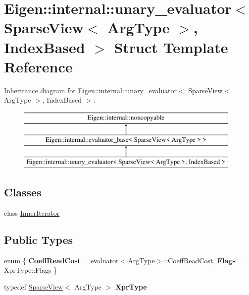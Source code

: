 \hypertarget{struct_eigen_1_1internal_1_1unary__evaluator_3_01_sparse_view_3_01_arg_type_01_4_00_01_index_based_01_4}{}\section{Eigen\+::internal\+::unary\+\_\+evaluator$<$ Sparse\+View$<$ Arg\+Type $>$, Index\+Based $>$ Struct Template Reference}
\label{struct_eigen_1_1internal_1_1unary__evaluator_3_01_sparse_view_3_01_arg_type_01_4_00_01_index_based_01_4}
Inheritance diagram for Eigen\+::internal\+::unary\+\_\+evaluator$<$ Sparse\+View$<$ Arg\+Type $>$, Index\+Based $>$\+:\begin{figure}[H]
\begin{center}
\leavevmode
\includegraphics[height=3.000000cm]{struct_eigen_1_1internal_1_1unary__evaluator_3_01_sparse_view_3_01_arg_type_01_4_00_01_index_based_01_4}
\end{center}
\end{figure}
\subsection*{Classes}
\begin{DoxyCompactItemize}
\item 
class \mbox{\hyperlink{class_eigen_1_1internal_1_1unary__evaluator_3_01_sparse_view_3_01_arg_type_01_4_00_01_index_based_01_4_1_1_inner_iterator}{Inner\+Iterator}}
\end{DoxyCompactItemize}
\subsection*{Public Types}
\begin{DoxyCompactItemize}
\item 
\mbox{\label{struct_eigen_1_1internal_1_1unary__evaluator_3_01_sparse_view_3_01_arg_type_01_4_00_01_index_based_01_4_a13f4da125c6786cc6b212c5bbc64f117}} 
enum \{ {\bfseries Coeff\+Read\+Cost} = evaluator$<$Arg\+Type$>$\+::Coeff\+Read\+Cost, 
{\bfseries Flags} = Xpr\+Type\+::Flags
 \}
\item 
\mbox{\label{struct_eigen_1_1internal_1_1unary__evaluator_3_01_sparse_view_3_01_arg_type_01_4_00_01_index_based_01_4_ad2888d8fc55a68579255c23a2ecc9bbd}} 
typedef \mbox{\hyperlink{class_eigen_1_1_sparse_view}{Sparse\+View}}$<$ Arg\+Type $>$ {\bfseries Xpr\+Type}
\end{DoxyCompactItemize}
